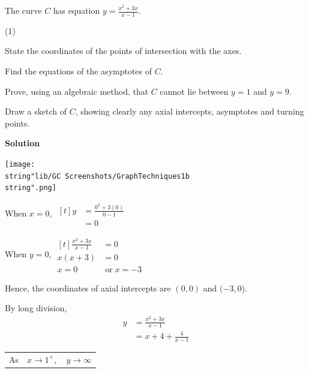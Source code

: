 \documentclass[11pt,a4paper]{book}
\begin{document}
\begin{example}{}

The curve $C$ has equation ${\displaystyle y=\frac{x^{2}+3x}{x-1}}$.

\begin{tasks}[label=(\alph*),label-width=3.5ex](1)

\task State the coordinates of the points of intersection with the axes.

\task Find the equations of the asymptotes of $C$.

\task Prove, using an algebraic method, that $C$ cannot lie between
$y=1$ and $y=9$.

\task Draw a sketch of $C$, showing clearly any axial intercepts,
asymptotes and turning points.

\end{tasks}

\textbf{Solution}

\begin{center}
\texttt{[image: \\string"lib/GC Screenshots/GraphTechniques1b\\string".png]}
\par\end{center}

\begin{tasks}[label=(\alph*),label-width=3.5ex]

\task  When $x=0$,
$
\begin{aligned}[t]
y & =\frac{0^{2}+3\left(0\right)}{0-1}\\
 & =0
\end{aligned}
$

When $y=0$,
$
\begin{aligned}[t]
\frac{x^{2}+3x}{x-1} & =0\\
x\left(x+3\right) & =0\\
x=0 & \;\text{or}\;x=-3
\end{aligned}
$

Hence, the coordinates of axial intercepts are $(0,0)$ and $(-3,0$).

\task  By long division,
\begin{align*}
{\displaystyle y} & =\frac{x^{2}+3x}{x-1}\\
 & =x+4+\frac{4}{x-1}
\end{align*}

\begin{tabular}{>{\raggedright}p{0.6cm}>{\raggedright}p{1.8cm}>{\raggedright}p{2cm}}
As & $x\rightarrow1^{+},$ & $y\rightarrow\infty$


\end{tabular}
\end{tasks}
\end{example}
\end{document}
